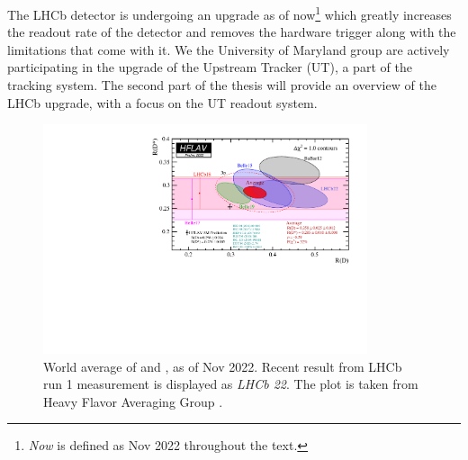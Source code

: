 The LHCb detector is undergoing an upgrade as of now\footnote{
    \emph{Now} is defined as Nov 2022 throughout the text.
} which greatly increases
the readout rate of the detector and removes the hardware trigger along
with the limitations that come with it.
We the University of Maryland group are actively participating in the upgrade
of the Upstream Tracker (UT), a part of the tracking system.
The second part of the thesis will provide an overview of the LHCb upgrade, with
a focus on the UT readout system.

\begin{figure}[!htb]
    \centering
    \includegraphics[width=0.85\textwidth]{./figs-intro/hflav_2022_preliminary.pdf}
    \caption{
        World average of \RD and \RDst, as of Nov 2022.
        Recent result from LHCb run 1 measurement is displayed as
        \emph{LHCb 22}.
        The plot is taken from Heavy Flavor Averaging Group
        \cite{Amhis:2022mac}.
    }
    \label{fig:hflav}
\end{figure}
